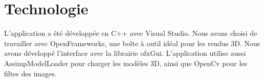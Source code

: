 \chapter{Technologie}
\label{s:technologie}

L’application a été développée en C++ avec Visual Studio. Nous avons choisi de travailler avec OpenFrameworks, une boîte à outil idéal pour les rendus 3D. Nous avons développé l’interface avec la librairie ofxGui. L'application utilise aussi AssimpModelLoader pour charger les modèles 3D, ainsi que OpenCv pour les filtes des images.\\